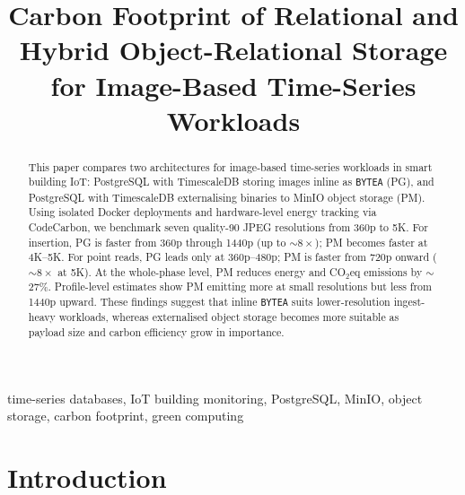 \documentclass[conference]{IEEEtran}
\begin{document}
\title{Carbon Footprint of Relational and Hybrid Object-Relational Storage for Image-Based Time-Series Workloads}

\author{
}


\maketitle

\begin{abstract}
This paper compares two architectures for image-based time-series workloads in smart building IoT: PostgreSQL with TimescaleDB storing images inline as \texttt{BYTEA} (PG), and PostgreSQL with TimescaleDB externalising binaries to MinIO object storage (PM). Using isolated Docker deployments and hardware-level energy tracking via CodeCarbon, we benchmark seven quality-90 JPEG resolutions from 360p to 5K. For insertion, PG is faster from 360p through 1440p (up to $\sim$$8\times$); PM becomes faster at 4K--5K. For point reads, PG leads only at 360p--480p; PM is faster from 720p onward ($\sim$$8\times$ at 5K). At the whole-phase level, PM reduces energy and CO$_2$eq emissions by $\sim$27\%. Profile-level estimates show PM emitting more at small resolutions but less from 1440p upward. These findings suggest that inline \texttt{BYTEA} suits lower-resolution ingest-heavy workloads, whereas externalised object storage becomes more suitable as payload size and carbon efficiency grow in importance.
\end{abstract}

\begin{IEEEkeywords}
time-series databases, IoT building monitoring, PostgreSQL, MinIO, object storage, carbon footprint, green computing
\end{IEEEkeywords}

\section{Introduction}
\label{sec:introduction}
\end{document}
